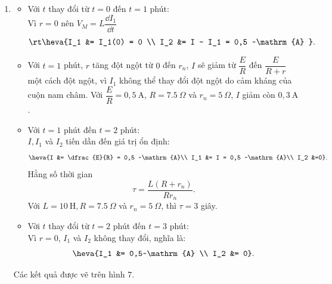 \begin{loigiai}
\begin{enumerate}[1)]
\begin{center}
    \end{center}
    \item 
    \begin{itemize}
        \item Với $t$ thay đổi từ $t = 0$ đến $t = 1$ phút:\\
    Vì $r =0$ nên $V_M = L\dfrac{\dd I_1}{\dd t}$
    \[\rt \heva{I_1 &= I_1(0) = 0 \\ I_2 &= I - I_1 = 0,5 ~\mathrm{A} }.\]
    \item Với $t = 1$ phút, $r$ tăng đột ngột từ $0$ đến $r_n$, $I$ sẽ giảm từ $\dfrac{E}{R}$ đến $\dfrac{E}{R + r}$ một cách đột ngột, vì $I_1$ không thể thay đổi đột ngột do cảm kháng của cuộn nam châm. Với $\dfrac{E}{R} = 0,5 ~\mathrm{A}$, $R = 7.5~\Omega$ và $r_n = 5~\Omega
$, $I$ giảm còn $0,3 ~\mathrm{A}$.\\
    \item Với $t= 1$ phút đến $t = 2$ phút:\\
    $I, I_1$ và $I_2$ tiến dần đến giá trị ổn định:
    \[\heva{I &= \dfrac{E}{R} = 0,5 ~\mathrm{A}\\ I_1 &= I = 0,5 ~\mathrm{A}\\ I_2 &=0}.\]
    Hằng số thời gian \[\tau = \dfrac{L(R+r_n)}{Rr_n}.\]
    Với $L = 10~\mathrm{H}, R = 7.5~\Omega$ và $r_n = 5~\Omega$, thì $\tau = 3$ giây.
    \item Vời $t$ thay đổi từ $t = 2$ phút đến $t = 3$ phút:\\
    Vì $r = 0$, $I_1$ và $I_2$ không thay đổi, nghĩa là:
    \[\heva{I_1 &= 0,5~\mathrm{A} \\ I_2 &= 0}.\]
    \end{itemize}
    Các kết quả được vẽ trên hình $7$.
    \begin{center}
        


\end{center}
\end{enumerate}
\end{loigiai}
